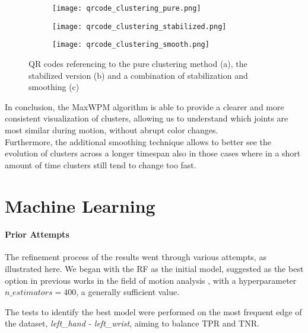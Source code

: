 \begin{figure}[H]
  \centering
  \begin{subfigure}[b]{0.49\textwidth}
    \centering
    \texttt{[image: qrcode\_clustering\_pure.png]}
    \caption{}
    \label{fig:qr_movement_pure}
  \end{subfigure}
  \hfill
  \begin{subfigure}[b]{0.49\textwidth}
    \centering
    \texttt{[image: qrcode\_clustering\_stabilized.png]}
    \caption{}
    \label{fig:qr_movement_stabilized}
  \end{subfigure}
  \hfill
  \begin{subfigure}[b]{0.49\textwidth}
    \centering
    \texttt{[image: qrcode\_clustering\_smooth.png]}
    \caption{}
    \label{fig:qr_movement_smooth}
  \end{subfigure}
  \caption{QR codes referencing to the pure clustering method (a), the stabilized version (b) and a combination of stabilization and smoothing (c)}
  \label{fig:qr_movements}
\end{figure}
\clearpage

In conclusion, the MaxWPM algorithm is able to provide a clearer and more consistent visualization of clusters, allowing us to understand which joints are most similar during motion, without abrupt color changes. \\
Furthermore, the additional smoothing technique allows to better see the evolution of clusters across a longer timespan also in those cases where in a short amount of time clusters still tend to change too fast.\\



\clearpage

\section{Machine Learning}

\paragraph{Prior Attempts}
The refinement process of the results went through various attempts, as illustrated here. 
We began with the RF as the initial model, suggested as the best option in previous works in the field of motion analysis \cite{oneto:2020}, with a hyperparameter $n\_estimators = 400$, a generally sufficient value.

The tests to identify the best model were performed on the most frequent edge of the dataset, \textit{left\_hand - left\_wrist}, aiming to balance TPR and TNR.

